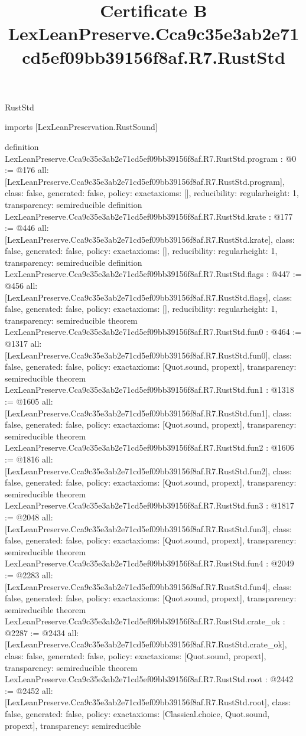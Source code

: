 \begin{lexlean}{RustStd}
\title{Certificate B LexLeanPreserve.Cca9c35e3ab2e71cd5ef09bb39156f8af.R7.RustStd}
\begin{coremodule}
imports [LexLeanPreservation.RustSound]

definition LexLeanPreserve.Cca9c35e3ab2e71cd5ef09bb39156f8af.R7.RustStd.program : @0 := @176 {
  all: [LexLeanPreserve.Cca9c35e3ab2e71cd5ef09bb39156f8af.R7.RustStd.program],
  class: false,
  generated: false,
  policy: exact{axioms: []},
  reducibility: regular{height: 1},
  transparency: semireducible
}
definition LexLeanPreserve.Cca9c35e3ab2e71cd5ef09bb39156f8af.R7.RustStd.krate : @177 := @446 {
  all: [LexLeanPreserve.Cca9c35e3ab2e71cd5ef09bb39156f8af.R7.RustStd.krate],
  class: false,
  generated: false,
  policy: exact{axioms: []},
  reducibility: regular{height: 1},
  transparency: semireducible
}
definition LexLeanPreserve.Cca9c35e3ab2e71cd5ef09bb39156f8af.R7.RustStd.flags : @447 := @456 {
  all: [LexLeanPreserve.Cca9c35e3ab2e71cd5ef09bb39156f8af.R7.RustStd.flags],
  class: false,
  generated: false,
  policy: exact{axioms: []},
  reducibility: regular{height: 1},
  transparency: semireducible
}
theorem LexLeanPreserve.Cca9c35e3ab2e71cd5ef09bb39156f8af.R7.RustStd.fun0 : @464 := @1317 {
  all: [LexLeanPreserve.Cca9c35e3ab2e71cd5ef09bb39156f8af.R7.RustStd.fun0],
  class: false,
  generated: false,
  policy: exact{axioms: [Quot.sound, propext]},
  transparency: semireducible
}
theorem LexLeanPreserve.Cca9c35e3ab2e71cd5ef09bb39156f8af.R7.RustStd.fun1 : @1318 := @1605 {
  all: [LexLeanPreserve.Cca9c35e3ab2e71cd5ef09bb39156f8af.R7.RustStd.fun1],
  class: false,
  generated: false,
  policy: exact{axioms: [Quot.sound, propext]},
  transparency: semireducible
}
theorem LexLeanPreserve.Cca9c35e3ab2e71cd5ef09bb39156f8af.R7.RustStd.fun2 : @1606 := @1816 {
  all: [LexLeanPreserve.Cca9c35e3ab2e71cd5ef09bb39156f8af.R7.RustStd.fun2],
  class: false,
  generated: false,
  policy: exact{axioms: [Quot.sound, propext]},
  transparency: semireducible
}
theorem LexLeanPreserve.Cca9c35e3ab2e71cd5ef09bb39156f8af.R7.RustStd.fun3 : @1817 := @2048 {
  all: [LexLeanPreserve.Cca9c35e3ab2e71cd5ef09bb39156f8af.R7.RustStd.fun3],
  class: false,
  generated: false,
  policy: exact{axioms: [Quot.sound, propext]},
  transparency: semireducible
}
theorem LexLeanPreserve.Cca9c35e3ab2e71cd5ef09bb39156f8af.R7.RustStd.fun4 : @2049 := @2283 {
  all: [LexLeanPreserve.Cca9c35e3ab2e71cd5ef09bb39156f8af.R7.RustStd.fun4],
  class: false,
  generated: false,
  policy: exact{axioms: [Quot.sound, propext]},
  transparency: semireducible
}
theorem LexLeanPreserve.Cca9c35e3ab2e71cd5ef09bb39156f8af.R7.RustStd.crate_ok : @2287 := @2434 {
  all: [LexLeanPreserve.Cca9c35e3ab2e71cd5ef09bb39156f8af.R7.RustStd.crate_ok],
  class: false,
  generated: false,
  policy: exact{axioms: [Quot.sound, propext]},
  transparency: semireducible
}
theorem LexLeanPreserve.Cca9c35e3ab2e71cd5ef09bb39156f8af.R7.RustStd.root : @2442 := @2452 {
  all: [LexLeanPreserve.Cca9c35e3ab2e71cd5ef09bb39156f8af.R7.RustStd.root],
  class: false,
  generated: false,
  policy: exact{axioms: [Classical.choice, Quot.sound, propext]},
  transparency: semireducible
}


\end{coremodule}
\end{lexlean}
